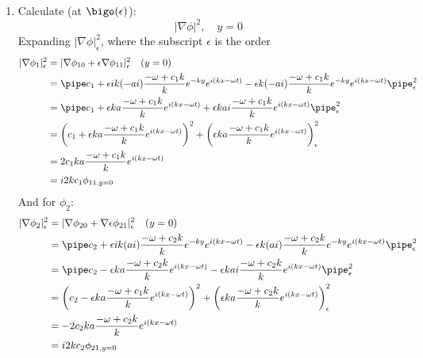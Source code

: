 \documentclass{/home/janmebows/Documents/LatexTemplates/myassignment}
\begin{document}
\begin{enumerate}
\begin{enumerate}
        \item %
        Calculate (at $\bigo(\epsilon)$):
        \[|\nabla \phi|^2,\quad y=0 \]
        Expanding $|\nabla \phi|^2_{\epsilon}$, where the subscript $\epsilon$ is the order
        \begin{align*}
            |\nabla \phi_{1}|^2_{\epsilon} &= |\nabla \phi_{10} + \epsilon\nabla \phi_{11}|^2_{\epsilon}\quad (y=0)\\
            &=\pipe c_1 + \epsilon ik(-ai)\frac{-\omega  + c_{1} k}{k}e^{-ky} e^{i(kx-\omega t)} -\epsilon  k(-ai)\frac{-\omega  + c_{1} k}{k}e^{-ky} e^{i(kx-\omega t)}\pipe ^2_{\epsilon}\\
            &=\pipe c_1 + \epsilon ka\frac{-\omega  + c_{1} k}{k} e^{i(kx-\omega t)} + \epsilon kai\frac{-\omega  + c_{1} k}{k}e^{i(kx-\omega t)}\pipe ^2_{\epsilon}\\
            &= \left(c_1 + \epsilon ka\frac{-\omega  + c_{1} k}{k} e^{i(kx-\omega t)}\right)^2 + \left(\epsilon ka\frac{-\omega  + c_{1} k}{k}e^{i(kx-\omega t)}\right)^2_{\epsilon}\\
            &= 2c_1ka\frac{-\omega  + c_{1} k}{k} e^{i(kx-\omega t)}\\
            &= i2kc_1 \phi_{11,y=0}
        \end{align*}
        And for $\phi_2$:
        \begin{align*}
            |\nabla \phi_{2}|^2_{\epsilon} &= |\nabla \phi_{20} + \nabla \epsilon\phi_{21}|^2_{\epsilon}\quad (y=0)\\
            &=\pipe c_2 + \epsilon ik(ai)\frac{-\omega  + c_{2} k}{k}e^{-ky} e^{i(kx-\omega t)} -\epsilon  k(ai)\frac{-\omega  + c_{2} k}{k}e^{-ky} e^{i(kx-\omega t)}\pipe ^2_{\epsilon}\\
            &=\pipe c_2 - \epsilon ka\frac{-\omega  + c_{2} k}{k} e^{i(kx-\omega t)} - \epsilon kai\frac{-\omega  + c_{2} k}{k}e^{i(kx-\omega t)}\pipe ^2_{\epsilon}\\
            &= \left(c_2 - \epsilon ka\frac{-\omega  + c_{1} k}{k} e^{i(kx-\omega t)}\right)^2 + \left(\epsilon ka\frac{-\omega  + c_{2} k}{k}e^{i(kx-\omega t)}\right)^2_{\epsilon}\\
            &= -2c_2ka\frac{-\omega  + c_{2} k}{k} e^{i(kx-\omega t)}\\
            &= i2kc_2\phi_{21,y=0}
        \end{align*}




\end{enumerate}
\end{enumerate}
\end{document}
